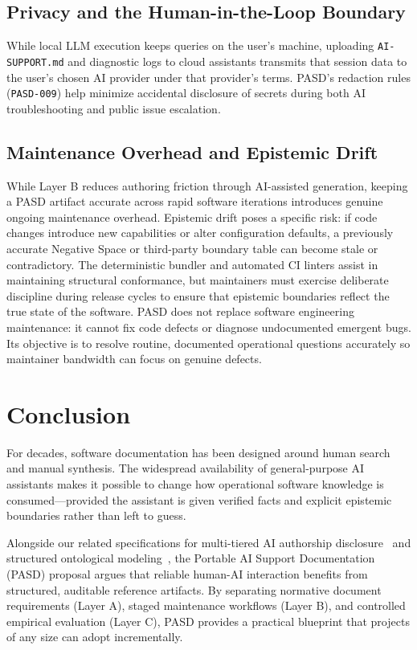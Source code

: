 \documentclass[12pt, a4paper]{article}
\begin{document}
\subsection{Privacy and the Human-in-the-Loop Boundary}
While local LLM execution keeps queries on the user's machine, uploading \texttt{AI-SUPPORT.md} and diagnostic logs to cloud assistants transmits that session data to the user's chosen AI provider under that provider's terms. PASD's redaction rules (\texttt{PASD-009}) help minimize accidental disclosure of secrets during both AI troubleshooting and public issue escalation.

\subsection{Maintenance Overhead and Epistemic Drift}
While Layer B reduces authoring friction through AI-assisted generation, keeping a PASD artifact accurate across rapid software iterations introduces genuine ongoing maintenance overhead. Epistemic drift poses a specific risk: if code changes introduce new capabilities or alter configuration defaults, a previously accurate Negative Space or third-party boundary table can become stale or contradictory. The deterministic bundler and automated CI linters assist in maintaining structural conformance, but maintainers must exercise deliberate discipline during release cycles to ensure that epistemic boundaries reflect the true state of the software. PASD does not replace software engineering maintenance: it cannot fix code defects or diagnose undocumented emergent bugs. Its objective is to resolve routine, documented operational questions accurately so maintainer bandwidth can focus on genuine defects.


\section{Conclusion}
\label{sec:conclusion}

For decades, software documentation has been designed around human search and manual synthesis. The widespread availability of general-purpose AI assistants makes it possible to change how operational software knowledge is consumed---provided the assistant is given verified facts and explicit epistemic boundaries rather than left to guess.

Alongside our related specifications for multi-tiered AI authorship disclosure~\citep{bee2026ats} and structured ontological modeling~\citep{bee2025soe}, the Portable AI Support Documentation (PASD) proposal argues that reliable human-AI interaction benefits from structured, auditable reference artifacts. By separating normative document requirements (Layer A), staged maintenance workflows (Layer B), and controlled empirical evaluation (Layer C), PASD provides a practical blueprint that projects of any size can adopt incrementally.
\end{document}
